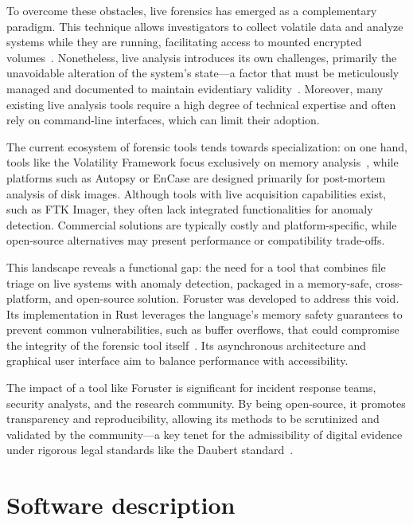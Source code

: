 \documentclass[preprint,12pt,a4paper]{elsarticle}
\begin{document}
To overcome these obstacles, live forensics has emerged as a complementary paradigm. This technique allows investigators to collect volatile data and analyze systems while they are running, facilitating access to mounted encrypted volumes~\cite{altheide2007live}. Nonetheless, live analysis introduces its own challenges, primarily the unavoidable alteration of the system's state—a factor that must be meticulously managed and documented to maintain evidentiary validity~\cite{brezinski2005technical}. Moreover, many existing live analysis tools require a high degree of technical expertise and often rely on command-line interfaces, which can limit their adoption.

The current ecosystem of forensic tools tends towards specialization: on one hand, tools like the Volatility Framework focus exclusively on memory analysis~\cite{ligh2014art}, while platforms such as Autopsy or EnCase are designed primarily for post-mortem analysis of disk images. Although tools with live acquisition capabilities exist, such as FTK Imager, they often lack integrated functionalities for anomaly detection. Commercial solutions are typically costly and platform-specific, while open-source alternatives may present performance or compatibility trade-offs.

This landscape reveals a functional gap: the need for a tool that combines file triage on live systems with anomaly detection, packaged in a memory-safe, cross-platform, and open-source solution. Foruster was developed to address this void. Its implementation in Rust leverages the language's memory safety guarantees to prevent common vulnerabilities, such as buffer overflows, that could compromise the integrity of the forensic tool itself~\cite{jung2021rustbelt}. Its asynchronous architecture and graphical user interface aim to balance performance with accessibility.

The impact of a tool like Foruster is significant for incident response teams, security analysts, and the research community. By being open-source, it promotes transparency and reproducibility, allowing its methods to be scrutinized and validated by the community—a key tenet for the admissibility of digital evidence under rigorous legal standards like the Daubert standard~\cite{carrier2003open}.

\section{Software description}
\end{document}
